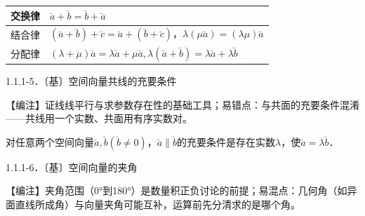 {\def\LTcaptype{none} %
\begin{longtable}[]{@{}
  >{\raggedright\arraybackslash}p{}
  >{\raggedright\arraybackslash}p{}@{}}
\toprule\noalign{}
\begin{minipage}[b]{\linewidth}\raggedright
交换律
\end{minipage} & \begin{minipage}[b]{\linewidth}\raggedright
\(\overset{⃑}{a} + \overset{⃑}{b} =\)\(\overset{⃑}{b} + \overset{⃑}{a}\)
\end{minipage} \\
\midrule\noalign{}
\endhead
\bottomrule\noalign{}
\endlastfoot
结合律 &
\(\left( \overset{⃑}{a} + \overset{⃑}{b} \right) + \overset{⃑}{c} =\)\(\overset{⃑}{a} + \left( \overset{⃑}{b} + \overset{⃑}{c} \right)\)，\(\lambda(\mu\overset{⃑}{a}) =\)\((\lambda\mu)\overset{⃑}{a}\) \\
分配律 &
\((\lambda + \mu)\overset{⃑}{a} = \lambda\overset{⃑}{a} + \mu\overset{⃑}{a},\lambda(\overset{⃑}{a} + \overset{⃑}{b}) =\)\(\lambda\overset{⃑}{a} + \lambda\overset{⃑}{b}\) \\
\end{longtable}
}

1.1.1-5．〔基〕空间向量共线的充要条件

【⁠编⁠注⁠】证线线平行与求参数存在性的基础工具；易错点：与共面的充要条件混淆------共线用一个实数、共面用有序实数对。

对任意两个空间向量\(\overset{⃑}{a},\overset{⃑}{b}(\overset{⃑}{b} \neq 0)\)，\(\overset{⃑}{a} \parallel \overset{⃑}{b}\)的充要条件是存在实数\(\lambda\)，使\(\overset{⃑}{a} = \lambda\overset{⃑}{b}\)．

1.1.1-6．〔基〕空间向量的夹角

【⁠编⁠注⁠】夹角范围（0°到180°）是数量积正负讨论的前提；易混点：几何角（如异面直线所成角）与向量夹角可能互补，运算前先分清求的是哪个角。

